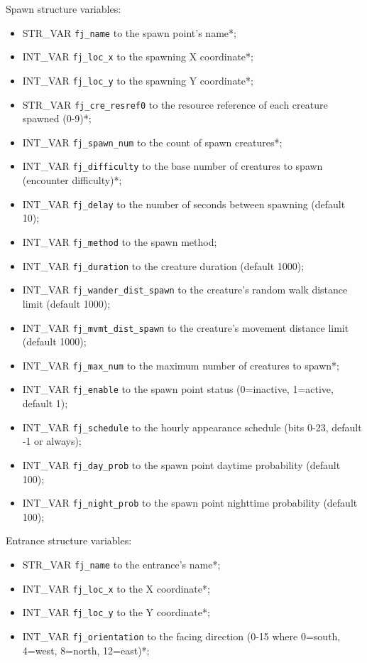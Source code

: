 \documentclass{article}
\begin{document}
Spawn structure variables:
\begin{itemize}
\item STR_VAR \verb+fj_name+ to the spawn point's name*;
\item INT_VAR \verb+fj_loc_x+ to the spawning X coordinate*;
\item INT_VAR \verb+fj_loc_y+ to the spawning Y coordinate*;
\item STR_VAR \verb+fj_cre_resref0+ to the resource reference of each creature spawned (0-9)*;
\item INT_VAR \verb+fj_spawn_num+ to the count of spawn creatures*;
\item INT_VAR \verb+fj_difficulty+ to the base number of creatures to spawn (encounter difficulty)*;
\item INT_VAR \verb+fj_delay+ to the number of seconds between spawning (default 10);
\item INT_VAR \verb+fj_method+ to the spawn method;
\item INT_VAR \verb+fj_duration+ to the creature duration (default 1000);
\item INT_VAR \verb+fj_wander_dist_spawn+ to the creature's random walk distance limit (default 1000);
\item INT_VAR \verb+fj_mvmt_dist_spawn+ to the creature's movement distance limit (default 1000);
\item INT_VAR \verb+fj_max_num+ to the maximum number of creatures to spawn*;
\item INT_VAR \verb+fj_enable+ to the spawn point status (0=inactive, 1=active, default 1);
\item INT_VAR \verb+fj_schedule+ to the hourly appearance schedule (bits 0-23, default -1 or always);
\item INT_VAR \verb+fj_day_prob+ to the spawn point daytime probability (default 100);
\item INT_VAR \verb+fj_night_prob+ to the spawn point nighttime probability (default 100);
\end{itemize}
Entrance structure variables:
\begin{itemize}
\item STR_VAR \verb+fj_name+ to the entrance's name*;
\item INT_VAR \verb+fj_loc_x+ to the X coordinate*;
\item INT_VAR \verb+fj_loc_y+ to the Y coordinate*;
\item INT_VAR \verb+fj_orientation+ to the facing direction (0-15 where 0=south, 4=west, 8=north, 12=east)*;
\end{itemize}
\end{document}
